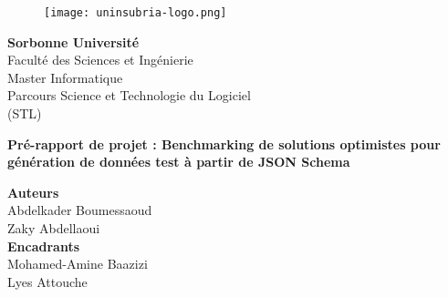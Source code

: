 \documentclass{article}
\begin{document}
\begin{titlepage}
\begin{figure}[!htb]
    \centering
    \texttt{[image: uninsubria-logo.png]}
\end{figure}

\begin{center}
    \Large{\textbf{Sorbonne Université}}
    \vspace{3mm}
    \\ \normalsize{Faculté des Sciences et Ingénierie}
    \vspace{6mm}
    \\ \normalsize{Master Informatique}
    \\ \normalsize{Parcours Science et Technologie du Logiciel}
    \\  \normalsize{(STL)}
    \vspace{13mm}
\end{center}

\vspace{8mm}
\begin{center}
    \LARGE{\textbf{Pré-rapport de projet : Benchmarking de solutions optimistes pour génération de données test à partir de JSON Schema}}
\end{center}
\vspace{30mm}

\begin{minipage}[t]{0.47\textwidth}
	{\normalsize{\textbf{Auteurs}}{\normalsize\vspace{1mm}
    \\ \normalsize{Abdelkader Boumessaoud\\ Zaky Abdellaoui}}} \\
    
    {\normalsize{\textbf{Encadrants}}{\normalsize\vspace{1mm}
    \\ \normalsize{Mohamed-Amine Baazizi\\ Lyes Attouche}}}
\end{minipage}


\end{titlepage}


\newcommand{\json}[0]{JSON Schema}
\newcommand{\jsonsch}[0]{JSON Schema }
\newcommand{\jsf}[0]{JSON Schema Faker }
\newcommand{\je}[0]{\texttt{json-everything} }

\newpage
\tableofcontents
\newpage




\end{document}
